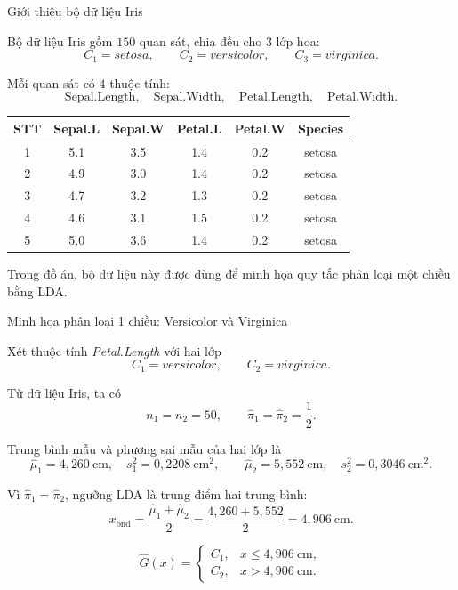\documentclass{beamer}
\begin{document}
\begin{frame}{Giới thiệu bộ dữ liệu Iris}
	\small
	
	Bộ dữ liệu Iris gồm \(150\) quan sát, chia đều cho \(3\) lớp hoa:
	\[
	C_1=\textit{setosa},\qquad
	C_2=\textit{versicolor},\qquad
	C_3=\textit{virginica}.
	\]
	
	Mỗi quan sát có \(4\) thuộc tính:
	\[
	\text{Sepal.Length},\quad
	\text{Sepal.Width},\quad
	\text{Petal.Length},\quad
	\text{Petal.Width}.
	\]
	
	\vspace{0.1cm}
	\begin{center}
		\renewcommand{\arraystretch}{1.15}
		\begin{tabular}{|c|c|c|c|c|c|}
			\hline
			STT & Sepal.L & Sepal.W & Petal.L & Petal.W & Species \\ \hline
			1 & 5.1 & 3.5 & 1.4 & 0.2 & setosa \\ 
			2 & 4.9 & 3.0 & 1.4 & 0.2 & setosa \\ 
			3 & 4.7 & 3.2 & 1.3 & 0.2 & setosa \\ 
			4 & 4.6 & 3.1 & 1.5 & 0.2 & setosa \\ 
			5 & 5.0 & 3.6 & 1.4 & 0.2 & setosa \\ \hline
		\end{tabular}
	\end{center}
	
	Trong đồ án, bộ dữ liệu này được dùng để minh họa quy tắc phân loại một chiều bằng LDA.
\end{frame}

\begin{frame}{Minh họa phân loại 1 chiều: Versicolor và Virginica}
	\small
	
	Xét thuộc tính \textit{Petal.Length} với hai lớp
	\[
	C_1=\textit{versicolor},\qquad C_2=\textit{virginica}.
	\]
	
	Từ dữ liệu Iris, ta có
	\[
	n_1=n_2=50,\qquad \widehat{\pi}_1=\widehat{\pi}_2=\frac{1}{2}.
	\]
	
	Trung bình mẫu và phương sai mẫu của hai lớp là
	\[
	\widehat{\mu}_1=4{,}260\ \text{cm},\quad s_1^2=0{,}2208\ \text{cm}^2,
	\qquad
	\widehat{\mu}_2=5{,}552\ \text{cm},\quad s_2^2=0{,}3046\ \text{cm}^2.
	\]
	
	
	Vì \(\widehat{\pi}_1=\widehat{\pi}_2\), ngưỡng LDA là trung điểm hai trung bình:
	\[
	x_{\text{bnd}}
	=
	\frac{\widehat{\mu}_1+\widehat{\mu}_2}{2}
	=
	\frac{4{,}260+5{,}552}{2}
	=
	4{,}906\ \text{cm}.
	\]
	
	\[
	\widehat{G}(x)
	=
	\begin{cases}
		C_1, & x\le 4{,}906\ \text{cm},\\
		C_2, & x>4{,}906\ \text{cm}.
	\end{cases}
	\]
\end{frame}
\end{document}
